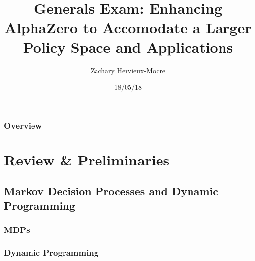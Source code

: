\documentclass{beamer}
\title[Short title]{Generals Exam: Enhancing AlphaZero to Accomodate a Larger Policy Space and Applications} %
\author{Zachary Hervieux-Moore} %
\date{18/05/18} %
\begin{document}
\begin{frame}
\titlepage %
\end{frame}

\begin{frame}
\frametitle{Overview} %
\tableofcontents %
\end{frame}


\section{Review \& Preliminaries} %

\subsection{Markov Decision Processes and Dynamic Programming} %


\begin{frame}
\frametitle{MDPs}
\end{frame}



\begin{frame}
\frametitle{Dynamic Programming}
\end{frame}
\end{document}
